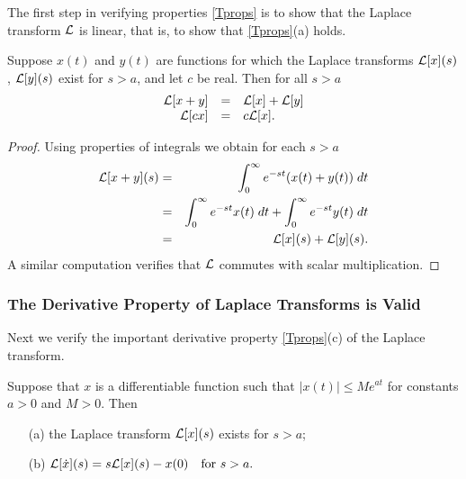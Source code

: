 \documentclass{ximera}
\begin{document}
The first step in verifying properties \eqref{Tprops} is to show that the 
Laplace transform ${\cal L}$ is linear, that is, to 
show that \eqref{Tprops}(a) holds.
\begin{proposition}  \label{prop:linLap}
Suppose $x(t)$ and $y(t)$ are functions for which the Laplace transforms
${\cal L}[x](s)$, ${\cal L}[y](s)$ exist for $s>a$, and let $c$ be real. 
Then for all $s>a$
\begin{equation}  \label{eq:linLap}
\begin{array}{rcl}
{\cal L}[x + y] &  = & {\cal L}[x] + {\cal L}[y] \\
{\cal L}[cx] & = & c{\cal L}[x].
\end{array}
\end{equation}
\end{proposition}

\begin{proof} Using properties of integrals we obtain for each $s>a$
\begin{eqnarray*}
{\cal L}[x+y](s) &=& \int_0^{\infty} e^{-st} (x(t)+y(t))\; dt\\
&=& \int_0^{\infty} e^{-st} x(t)\; dt + \int_0^{\infty} e^{-st} y(t)\; dt\\
&=& {\cal L}[x](s)+ {\cal L}[y](s).
\end{eqnarray*}
A similar computation verifies that ${\cal L}$ commutes with scalar 
multiplication.  \end{proof}

\subsubsection*{The Derivative Property of Laplace Transforms is Valid}

Next we verify the important derivative property \eqref{Tprops}(c) of the 
Laplace transform.  

\begin{proposition}  \label{prop:derLap}
Suppose that $x$ is a differentiable function such that 
$|x(t)|\le Me^{at}$ for constants $a>0$ and $M>0$.  
Then
\begin{itemize}
\item[(a)] the Laplace transform ${\cal L}[x](s)$ exists for $s>a$; 
\item[(b)] ${\cal L}[\dot x](s) = s{\cal L}[x](s) - x(0) \quad 
\mbox{for $s>a$.}$
\end{itemize}
\end{proposition}
\end{document}
